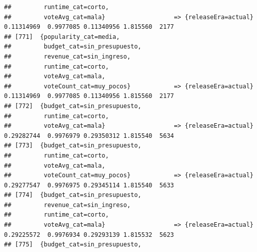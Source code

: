 \documentclass[
]{article}
\begin{document}
\begin{verbatim}
##         runtime_cat=corto,                                                                                                      
##         voteAvg_cat=mala}                   => {releaseEra=actual}               0.11314969  0.9977085 0.11340956 1.815560  2177
## [771]  {popularity_cat=media,                                                                                                   
##         budget_cat=sin_presupuesto,                                                                                             
##         revenue_cat=sin_ingreso,                                                                                                
##         runtime_cat=corto,                                                                                                      
##         voteAvg_cat=mala,                                                                                                       
##         voteCount_cat=muy_pocos}            => {releaseEra=actual}               0.11314969  0.9977085 0.11340956 1.815560  2177
## [772]  {budget_cat=sin_presupuesto,                                                                                             
##         runtime_cat=corto,                                                                                                      
##         voteAvg_cat=mala}                   => {releaseEra=actual}               0.29282744  0.9976979 0.29350312 1.815540  5634
## [773]  {budget_cat=sin_presupuesto,                                                                                             
##         runtime_cat=corto,                                                                                                      
##         voteAvg_cat=mala,                                                                                                       
##         voteCount_cat=muy_pocos}            => {releaseEra=actual}               0.29277547  0.9976975 0.29345114 1.815540  5633
## [774]  {budget_cat=sin_presupuesto,                                                                                             
##         revenue_cat=sin_ingreso,                                                                                                
##         runtime_cat=corto,                                                                                                      
##         voteAvg_cat=mala}                   => {releaseEra=actual}               0.29225572  0.9976934 0.29293139 1.815532  5623
## [775]  {budget_cat=sin_presupuesto,                                                                                             

\end{verbatim}
\end{document}
